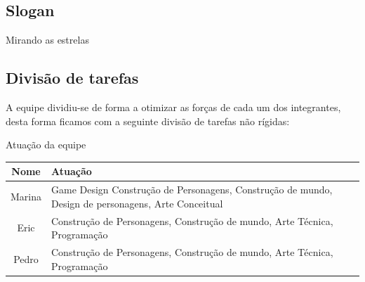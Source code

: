 \subsection{Slogan}

Mirando as estrelas

\subsection{Divisão de tarefas}

A equipe dividiu-se de forma a
otimizar as forças de cada um dos integrantes, desta forma ficamos com a
seguinte divisão de tarefas não rígidas:

\begin{quadro}[htb] \caption{\label{quadro_atuacao}Atuação da equipe}
    \begin{tabularx}{\textwidth}{|c|X|} \hline \textbf{Nome} &
        \textbf{Atuação}\\ \hline Marina & Game Design Construção de
        Personagens, Construção de mundo, Design de personagens, Arte Conceitual
        \\ \hline Eric   & Construção de Personagens, Construção de mundo, Arte
        Técnica, Programação                                        \\ \hline
        Pedro  & Construção de Personagens, Construção de mundo, Arte Técnica,
        Programação \\ \hline \end{tabularx} 
\end{quadro}

